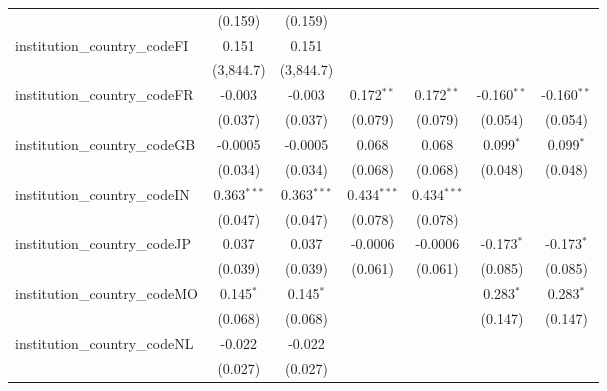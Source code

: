 \begin{tabular}{lcccccc}
                                         & (0.159)        & (0.159)        &               &               &                &   \\   
   institution\_country\_codeFI          & 0.151          & 0.151          &               &               &                &   \\   
                                         & (3,844.7)      & (3,844.7)      &               &               &                &   \\   
   institution\_country\_codeFR          & -0.003         & -0.003         & 0.172$^{**}$  & 0.172$^{**}$  & -0.160$^{**}$  & -0.160$^{**}$\\   
                                         & (0.037)        & (0.037)        & (0.079)       & (0.079)       & (0.054)        & (0.054)\\   
   institution\_country\_codeGB          & -0.0005        & -0.0005        & 0.068         & 0.068         & 0.099$^{*}$    & 0.099$^{*}$\\   
                                         & (0.034)        & (0.034)        & (0.068)       & (0.068)       & (0.048)        & (0.048)\\   
   institution\_country\_codeIN          & 0.363$^{***}$  & 0.363$^{***}$  & 0.434$^{***}$ & 0.434$^{***}$ &                &   \\   
                                         & (0.047)        & (0.047)        & (0.078)       & (0.078)       &                &   \\   
   institution\_country\_codeJP          & 0.037          & 0.037          & -0.0006       & -0.0006       & -0.173$^{*}$   & -0.173$^{*}$\\   
                                         & (0.039)        & (0.039)        & (0.061)       & (0.061)       & (0.085)        & (0.085)\\   
   institution\_country\_codeMO          & 0.145$^{*}$    & 0.145$^{*}$    &               &               & 0.283$^{*}$    & 0.283$^{*}$\\   
                                         & (0.068)        & (0.068)        &               &               & (0.147)        & (0.147)\\   
   institution\_country\_codeNL          & -0.022         & -0.022         &               &               &                &   \\   
                                         & (0.027)        & (0.027)        &               &               &                &   \\   

\end{tabular}
